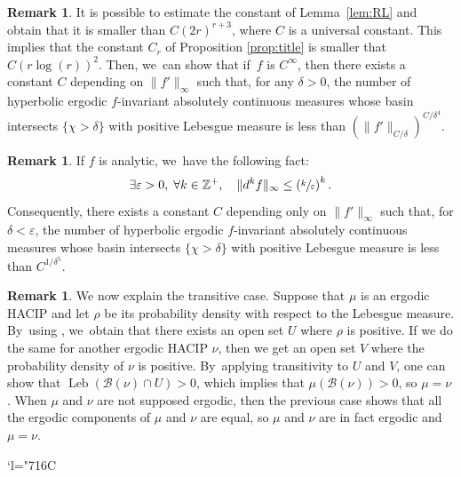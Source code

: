 \documentclass[10pt]{amsart}
\newcommand{\Changelback}{\mathcode`l="716C}
\DeclareMathOperator{\Leb}{Leb}
\let\rC C
\theoremstyle{definition}
\newtheorem{rmq}[thm]{Remark}
\newcommand{\bbZ}{{\mathbb{Z}}}
\begin{document}
\begin{rmq}
It is possible to estimate the constant of Lemma~\ref{lem:RL} and obtain that it is smaller than $C (2r)^{r+3}$, where $C$ is a universal constant. This implies that the constant $C_r$ of Proposition \ref{prop:title} is smaller that $C (r \log(r))^2$. Then, we~can show that if~$f$ is $\rC^{\infty}$, then there exists a constant $C$ depending on $\| f' \|_{\infty}$ such that, for any $\delta > 0$, the number of hyperbolic ergodic $f$\nobreakdash-invariant absolutely continuous measures whose basin intersects $\{ \chi > \delta \}$ with positive Lebesgue measure is less than
$
\left (\| f' \|_{C/\delta} \right)^{C / \delta^4}
$.
\end{rmq}

\begin{rmq}
\label{rmq:analytic}
If $f$ is analytic, we~have the following fact:
\[
\exists \varepsilon > 0,\; \forall k \in \bbZ^+,\quad \| d^k f\|_{\infty} \leq \left (\sfrac{k}{\varepsilon} \right)^k.
\]
Consequently, there exists a constant $C$ depending only on $\| f' \|_{\infty}$ such that, for $\delta < \varepsilon$, the number of hyperbolic ergodic $f$\nobreakdash-invariant absolutely continuous measures whose basin intersects $\{ \chi > \delta \}$ with positive Lebesgue measure is less than
$
C^{1 / \delta^5}
$.
\end{rmq}

\begin{rmq}
\label{rmq:trans}
We now explain the transitive case. Suppose that $\mu$ is an ergodic HACIP and let $\rho$ be its probability density with respect to the Lebesgue measure. By~using \cite[Lem.\,VII.9.1]{SETE}, we~obtain that there exists an open set $U$ where $\rho$ is positive.
If we do the same for another ergodic HACIP $\nu$, then we get an open set $V$ where the probability density of $\nu$ is positive. By~applying transitivity to $U$ and $V$, one can show that $\Leb(\mathcal{B}(\nu) \cap U) > 0$, which implies that $\mu(\mathcal{B}(\nu)) > 0$, so $\mu=\nu$.
When $\mu$ and $\nu$ are not supposed ergodic, then the previous case shows that all the ergodic components of $\mu$ and $\nu$ are equal, so $\mu$ and $\nu$ are in fact ergodic and $\mu=\nu$.
\end{rmq}


\newpage

\smaller\smaller
\renewcommand{\glossaryname}{Index of notations}
\printnoidxglossary[title={Index of notations}]
\Changelback
\larger\larger
\clearpage
\renewcommand{\glossaryname}{References}
\end{document}
